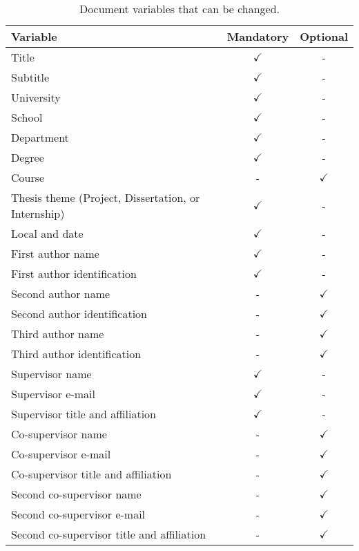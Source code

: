 \begin{table}[!htpb]
    \centering
    \caption{Document variables that can be changed.}
    \label{tab:doc-variables}
    \begin{tabular}{lcc}
        \toprule
            \textbf{Variable} & \textbf{Mandatory} & \textbf{Optional} \\
        \midrule
            Title & $\checkmark$ & - \\
            Subtitle & $\checkmark$ & - \\
            University & $\checkmark$ & - \\
            School & $\checkmark$ & - \\
            Department & $\checkmark$ & - \\
            Degree & $\checkmark$ & - \\
            Course & - & $\checkmark$ \\
            Thesis theme (Project, Dissertation, or Internship) & $\checkmark$ & - \\
            Local and date & $\checkmark$ & - \\ 
            
            First author name & $\checkmark$ & - \\
            First author identification & $\checkmark$ & - \\ 

            Second author name & - & $\checkmark$ \\
            Second author identification & - & $\checkmark$ \\ 

            Third author name & - & $\checkmark$ \\
            Third author identification & - & $\checkmark$ \\ 

            Supervisor name & $\checkmark$ & - \\
            Supervisor e-mail & $\checkmark$ & - \\
            Supervisor title and affiliation & $\checkmark$ & - \\ 

            Co-supervisor name & - & $\checkmark$ \\
            Co-supervisor e-mail & - & $\checkmark$ \\
            Co-supervisor title and affiliation & - & $\checkmark$ \\ 

            Second co-supervisor name & - & $\checkmark$ \\
            Second co-supervisor e-mail & - & $\checkmark$ \\
            Second co-supervisor title and affiliation & - & $\checkmark$ \\
        \bottomrule
    \end{tabular}
\end{table}